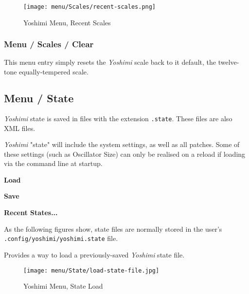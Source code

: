 \begin{figure}[H]
   \centering 
   \texttt{[image: menu/Scales/recent-scales.png]}
   \caption{Yoshimi Menu, Recent Scales}
   \label{fig:yoshimi_menu_recent_scales}
\end{figure}

\subsubsection{Menu / Scales / Clear}
\label{subsec:menu_scales_clear}

   This menu entry simply resets the \textsl{Yoshimi} scale back to it default,
   the twelve-tone equally-tempered scale.

\subsection{Menu / State}
\label{subsec:menu_state}

   \textsl{Yoshimi} state is saved in files with the extension
   \texttt{.state}.  These files are also XML files.

   \textsl{Yoshimi} "state" will include the system settings, as well as all
   patches. Some of these settings (such as Oscillator Size) can only be
   realised on a reload if loading via the command line at startup.


   \begin{enumber}
      \item \textbf{Load}
      \item \textbf{Save}
      \item \textbf{Recent States...}
   \end{enumber}

   As the following figures show, state files are normally stored in the
   user's \texttt{.config/yoshimi/yoshimi.state} file.

   \setcounter{ItemCounter}{0}      %

   Provides a way to load a previously-saved \textsl{Yoshimi} state file.

\begin{figure}[H]
   \centering 
   \texttt{[image: menu/State/load-state-file.jpg]}
   \caption{Yoshimi Menu, State Load}
   \label{fig:yoshimi_menu_state_load}
\end{figure}

